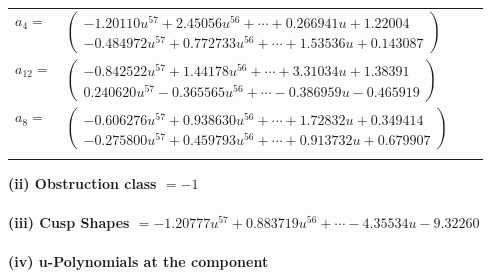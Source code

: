 \documentclass[1p]{elsarticle_modified}
\theoremstyle{definition}
\begin{document}
\begin{tabular}{m{7pt} m{180pt} m{7pt} m{180pt} }
\flushright $a_{4}=$&$\begin{pmatrix}-1.20110 u^{57}+2.45056 u^{56}+\cdots+0.266941 u+1.22004\\-0.484972 u^{57}+0.772733 u^{56}+\cdots+1.53536 u+0.143087\end{pmatrix}$ \\
\flushright $a_{12}=$&$\begin{pmatrix}-0.842522 u^{57}+1.44178 u^{56}+\cdots+3.31034 u+1.38391\\0.240620 u^{57}-0.365565 u^{56}+\cdots-0.386959 u-0.465919\end{pmatrix}$ \\
\flushright $a_{8}=$&$\begin{pmatrix}-0.606276 u^{57}+0.938630 u^{56}+\cdots+1.72832 u+0.349414\\-0.275800 u^{57}+0.459793 u^{56}+\cdots+0.913732 u+0.679907\end{pmatrix}$\\&\end{tabular}
\flushleft \textbf{(ii) Obstruction class $= -1$}\\~\\
\flushleft \textbf{(iii) Cusp Shapes $= -1.20777 u^{57}+0.883719 u^{56}+\cdots-4.35534 u-9.32260$}\\~\\
\newpage\renewcommand{\arraystretch}{1}
\flushleft \textbf{(iv) u-Polynomials at the component}\newline \\
\end{document}
